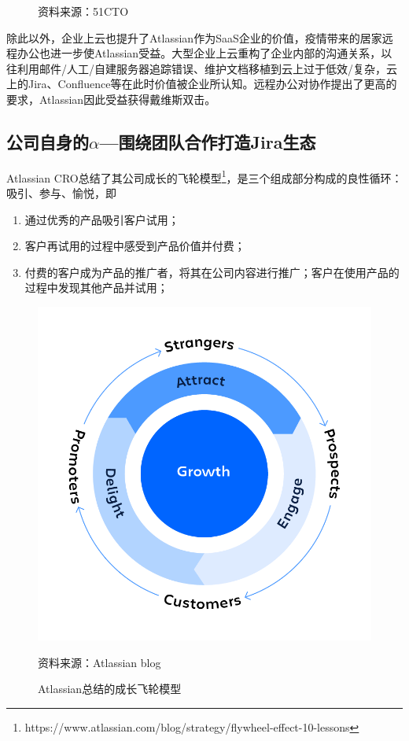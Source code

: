\begin{figure}[H]
\begin{center}
\begin{minipage}{0.3\linewidth}
        \end{minipage}
    \end{center}
    \footnotesize{资料来源：51CTO}
\end{figure}

除此以外，企业上云也提升了Atlassian作为SaaS企业的价值，疫情带来的居家远程办公也进一步使Atlassian受益。大型企业上云重构了企业内部的沟通关系，以往利用邮件/人工/自建服务器追踪错误、维护文档移植到云上过于低效/复杂，云上的Jira、Confluence等在此时价值被企业所认知。远程办公对协作提出了更高的要求，Atlassian因此受益获得戴维斯双击。
\subsection{公司自身的\texorpdfstring{$\alpha$}——围绕团队合作打造Jira生态}
Atlassian CRO总结了其公司成长的飞轮模型\footnote{https://www.atlassian.com/blog/strategy/flywheel-effect-10-lessons}，是三个组成部分构成的良性循环：吸引、参与、愉悦，即
\begin{enumerate}
    \item 通过优秀的产品吸引客户试用；
    \item 客户再试用的过程中感受到产品价值并付费；
    \item 付费的客户成为产品的推广者，将其在公司内容进行推广；客户在使用产品的过程中发现其他产品并试用；
\end{enumerate}
\begin{figure}[H]
    \caption{Atlassian总结的成长飞轮模型}
    \begin{center}
        \includegraphics[width=0.8\linewidth]{img/flywheel.png}
    \end{center}
    \footnotesize{资料来源：Atlassian blog}
\end{figure}
